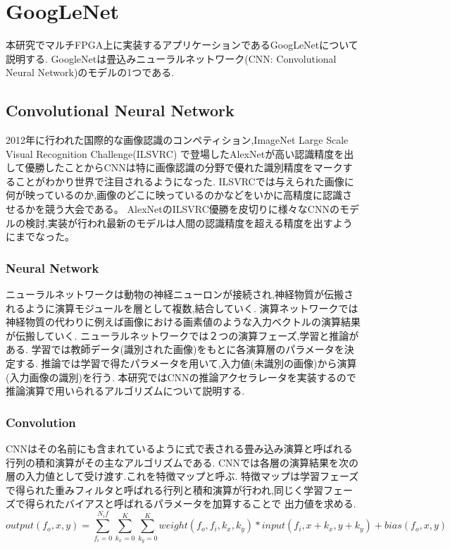 \chapter{GoogLeNet}
{
\label{chap:googlenet}
本研究でマルチFPGA上に実装するアプリケーションであるGoogLeNet\cite{googlenet}について説明する.
GoogleNetは畳込みニューラルネットワーク(CNN: Convolutional Neural Network)のモデルの1つである.

\section{Convolutional Neural Network}
\label{sec:cnn}
2012年に行われた国際的な画像認識のコンペティション,ImageNet Large Scale Visual Recognition Challenge(ILSVRC)
で登場したAlexNet\cite{alexnet}が高い認識精度を出して優勝したことからCNNは特に画像認識の分野で優れた識別精度をマークすることがわかり世界で注目されるようになった.
ILSVRCでは与えられた画像に何が映っているのか,画像のどこに映っているのかなどをいかに高精度に認識させるかを競う大会である。
AlexNetのILSVRC優勝を皮切りに様々なCNNのモデルの検討,実装が行われ最新のモデルは人間の認識精度を超える精度を出すようにまでなった。

\subsection{Neural Network}
\label{sec:nn}
ニューラルネットワークは動物の神経ニューロンが接続され,神経物質が伝搬されるように演算モジュールを層として複数,結合していく.
演算ネットワークでは神経物質の代わりに例えば画像における画素値のような入力ベクトルの演算結果が伝搬していく.
ニューラルネットワークでは２つの演算フェーズ,学習と推論がある.
学習では教師データ(識別された画像)をもとに各演算層のパラメータを決定する.
推論では学習で得たパラメータを用いて,入力値(未識別の画像)から演算(入力画像の識別)を行う.
本研究ではCNNの推論アクセラレータを実装するので推論演算で用いられるアルゴリズムについて説明する.

\subsection{Convolution}
\label{sec:conv}
CNNはその名前にも含まれているように式で表される畳み込み演算と呼ばれる行列の積和演算がその主なアルゴリズムである.
CNNでは各層の演算結果を次の層の入力値として受け渡す.これを特徴マップと呼ぶ.
特徴マップは学習フェーズで得られた重みフィルタと呼ばれる行列と積和演算が行われ,同じく学習フェーズで得られたバイアスと呼ばれるパラメータを加算することで
出力値を求める.
\begin{equation}
	output(f_o, x, y) = \sum_{f_i = 0}^{N_if}\sum_{k_x = 0}^{K}\sum_{k_y = 0}^{K}weight(f_o, f_i,k_x,k_y) * input(f_i,x + k_x, y + k_y) + bias(f_o, x, y)
\end{equation}

}
